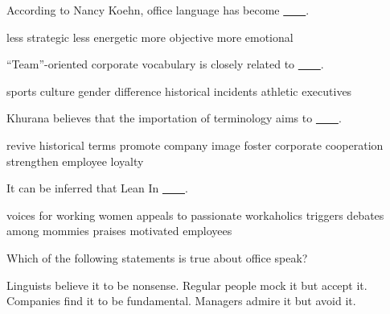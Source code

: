 \item According to Nancy Koehn, office language has become \uline{~~~~}.
\begin{tasks}
	\task less strategic
	\task less energetic
	\task more objective
	\task more emotional
\end{tasks}
\item ``Team''-oriented corporate vocabulary is closely related to \uline{~~~~}.
\begin{tasks}
	\task sports culture
	\task gender difference
	\task historical incidents
	\task athletic executives
\end{tasks}
\item Khurana believes that the importation of terminology aims to \uline{~~~~}.
\begin{tasks}
	\task revive historical terms
	\task promote company image
	\task foster corporate cooperation
	\task strengthen employee loyalty
\end{tasks}
\item It can be inferred that Lean In \uline{~~~~}.
\begin{tasks}
	\task voices for working women
	\task appeals to passionate workaholics
	\task triggers debates among mommies
	\task praises motivated employees
\end{tasks}
\item Which of the following statements is true about office speak?
\begin{tasks}
	\task Linguists believe it to be nonsense.
	\task Regular people mock it but accept it.
	\task Companies find it to be fundamental.
	\task Managers admire it but avoid it.
\end{tasks}